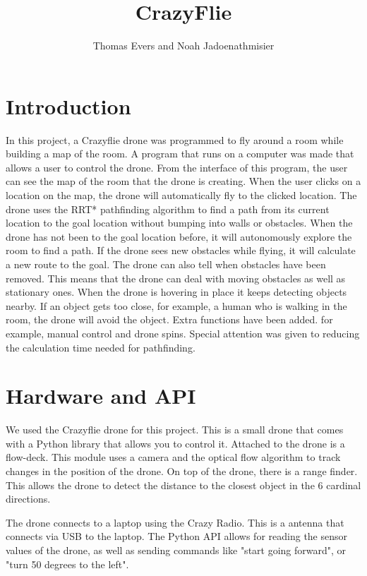 \documentclass{article}
\title{CrazyFlie}
\author{Thomas Evers and Noah Jadoenathmisier}
\begin{document}
\maketitle

\section{Introduction}
In this project, a Crazyflie drone was programmed to fly around a room while building a map of the room. A program that runs on a computer was made that allows a user to control the drone. From the interface of this program, the user can see the map of the room that the drone is creating. When the user clicks on a location on the map, the drone will automatically fly to the clicked location. The drone uses the RRT* pathfinding algorithm to find a path from its current location to the goal location without bumping into walls or obstacles. When the drone has not been to the goal location before, it will autonomously explore the room to find a path. If the drone sees new obstacles while flying, it will calculate a new route to the goal. The drone can also tell when obstacles have been removed. This means that the drone can deal with moving obstacles as well as stationary ones. When the drone is hovering in place it keeps detecting objects nearby. If an object gets too close, for example, a human who is walking in the room, the drone will avoid the object. Extra functions have been added. for example, manual control and drone spins. Special attention was given to reducing the calculation time needed for pathfinding.

\section{Hardware and API}
We used the Crazyflie drone for this project.
This is a small drone that comes with a Python library that allows you to control it.
Attached to the drone is a flow-deck.
This module uses a camera and the optical flow algorithm to track changes in the position of the drone.
On top of the drone, there is a range finder.
This allows the drone to detect the distance to the closest object in the 6 cardinal directions.

The drone connects to a laptop using the Crazy Radio.
This is a antenna that connects via USB to the laptop.
The Python API allows for reading the sensor values of the drone, as well as sending commands like "start going forward", or "turn 50 degrees to the left".
\end{document}
